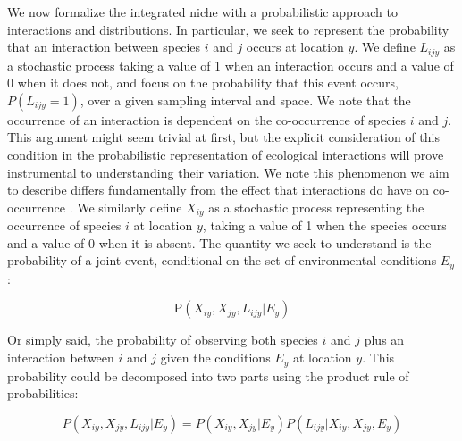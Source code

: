 \documentclass[12pt]{article}
\begin{document}
We now formalize the integrated niche with a probabilistic approach to
interactions and distributions. In particular, we seek to represent the
probability that an interaction between species $i$ and $j$ occurs at location
$y$. We define $L_{ijy}$ as a stochastic process taking a value of 1 when an
interaction occurs and a value of 0 when it does not, and focus on the
probability that this event occurs, $P(L_{ijy} = 1)$, over a given sampling
interval and space. We note that the occurrence of an interaction is dependent
on the co-occurrence of species $i$ and $j$. This argument might seem trivial
at first, but the explicit consideration of this condition in the
probabilistic representation of ecological interactions will prove
instrumental to understanding their variation. We note this phenomenon we aim
to describe differs fundamentally from the effect that interactions do have on
co-occurrence \citep{Cazelles2016}. We similarly define $X_{iy}$ as a
stochastic process representing the occurrence of species $i$ at location
$y$, taking a value of 1 when the species occurs and a value of 0 when it is
absent. The quantity we seek to understand is the probability of a joint
event, conditional on the set of environmental conditions $E_y$:

\begin{equation}
	\text{P}(X_{iy},X_{jy},L_{ijy}|E_y)
\end{equation}

Or simply said, the probability of observing both species $i$ and $j$ plus an
interaction between $i$ and $j$ given the conditions $E_y$ at location $y$.
This probability could be decomposed into two parts using the product rule of
probabilities:

\begin{equation}
	P(X_{iy},X_{jy},L_{ijy}|E_y)=P(X_{iy},X_{jy}|E_y)P(L_{ijy}|X_{iy},X_{jy},E_y)
\end{equation}
\end{document}

